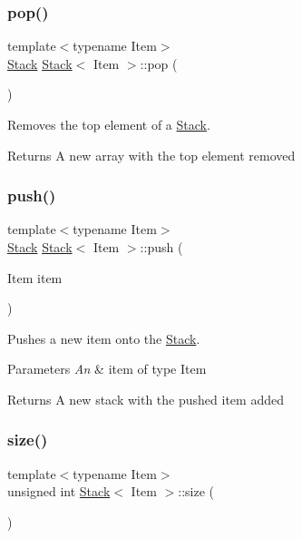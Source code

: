 \subsubsection{\texorpdfstring{pop()}{pop()}}
{\footnotesize\ttfamily template$<$typename Item$>$ \\
\hyperlink{class_stack}{Stack} \hyperlink{class_stack}{Stack}$<$ Item $>$\+::pop (\begin{DoxyParamCaption}{ }\end{DoxyParamCaption})}



Removes the top element of a \hyperlink{class_stack}{Stack}. 

\begin{DoxyReturn}{Returns}
A new array with the top element removed 
\end{DoxyReturn}
\mbox{\label{class_stack_a1b824e319a20ee57c37c1df2270f65d2}} 
\subsubsection{\texorpdfstring{push()}{push()}}
{\footnotesize\ttfamily template$<$typename Item$>$ \\
\hyperlink{class_stack}{Stack} \hyperlink{class_stack}{Stack}$<$ Item $>$\+::push (\begin{DoxyParamCaption}\item[{Item}]{item }\end{DoxyParamCaption})}



Pushes a new item onto the \hyperlink{class_stack}{Stack}. 


\begin{DoxyParams}{Parameters}
{\em An} & item of type Item \\
\hline
\end{DoxyParams}
\begin{DoxyReturn}{Returns}
A new stack with the pushed item added 
\end{DoxyReturn}
\mbox{\label{class_stack_acfa3b26a78a68e3627bcb9d5198a0b3c}} 
\subsubsection{\texorpdfstring{size()}{size()}}
{\footnotesize\ttfamily template$<$typename Item$>$ \\
unsigned int \hyperlink{class_stack}{Stack}$<$ Item $>$\+::size (\begin{DoxyParamCaption}{ }\end{DoxyParamCaption})}



